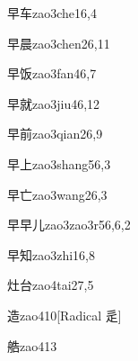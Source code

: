 \begin{verbete}{早车}{zao3che1}{6,4}
\end{verbete}

\begin{verbete}{早晨}{zao3chen2}{6,11}
\end{verbete}

\begin{verbete}{早饭}{zao3fan4}{6,7}
\end{verbete}

\begin{verbete}{早就}{zao3jiu4}{6,12}
\end{verbete}

\begin{verbete}{早前}{zao3qian2}{6,9}
\end{verbete}

\begin{verbete}{早上}{zao3shang5}{6,3}
\end{verbete}

\begin{verbete}{早亡}{zao3wang2}{6,3}
\end{verbete}

\begin{verbete}{早早儿}{zao3zao3r5}{6,6,2}
\end{verbete}

\begin{verbete}{早知}{zao3zhi1}{6,8}
\end{verbete}

\begin{verbete}{灶台}{zao4tai2}{7,5}
\end{verbete}

\begin{verbete}{造}{zao4}{10}[Radical 辵]
\end{verbete}

\begin{verbete}{艁}{zao4}{13}
\end{verbete}

